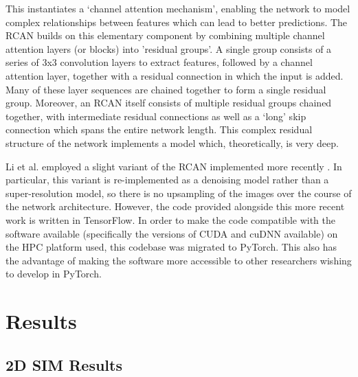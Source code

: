\documentclass[12pt]{article}
\begin{document}
This instantiates a `channel attention mechanism', enabling the network to model complex relationships between features which can lead to better predictions.
The RCAN builds on this elementary component by combining multiple channel attention layers (or blocks) into 'residual groups'.
A single group consists of a series of 3x3 convolution layers to extract features,
followed by a channel attention layer, together with a residual connection in which the input is added.
Many of these layer sequences are chained together to form a single residual group.
Moreover, an RCAN itself consists of multiple residual groups chained together,
with intermediate residual connections as well as a `long' skip connection which spans the entire network length.
This complex residual structure of the network implements a model which, theoretically, is very deep.

Li et al. employed a slight variant of the RCAN implemented more recently \cite{rcan2021}.
In particular, this variant is re-implemented as a denoising model rather than a super-resolution model,
so there is no upsampling of the images over the course of the network architecture.
However, the code provided alongside this more recent work is written in TensorFlow.
In order to make the code compatible with the software available (specifically the versions of CUDA and cuDNN available) on the HPC platform used,
this codebase was migrated to PyTorch.
This also has the advantage of making the software more accessible to other researchers wishing to develop in PyTorch.

\section{Results}

\subsection{2D SIM Results}
\end{document}
